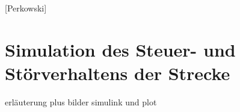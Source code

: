 
\newpage

[Perkowski]
\section{Simulation des Steuer- und Störverhaltens der Strecke} \label{Kapitel5}

erläuterung plus bilder simulink und plot